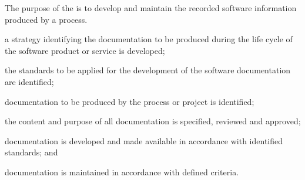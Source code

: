 			\begin{adjustwidth}{2em}{0pt} 

				The purpose of the  is to develop and maintain the recorded software information produced by a process.

			\end{adjustwidth}

			\begin{adjustwidth}{2em}{0pt} 

				\begin{compactitem}

					\item a strategy identifying the documentation to be produced during the life cycle of the software product or service is developed;

					\item the standards to be applied for the development of the software documentation are identified;

					\item documentation to be produced by the process or project is identified;

					\item the content and purpose of all documentation is specified, reviewed and approved;

					\item documentation is developed and made available in accordance with identified standards; and

					\item documentation is maintained in accordance with defined criteria.

				\end{compactitem}

			\end{adjustwidth}

